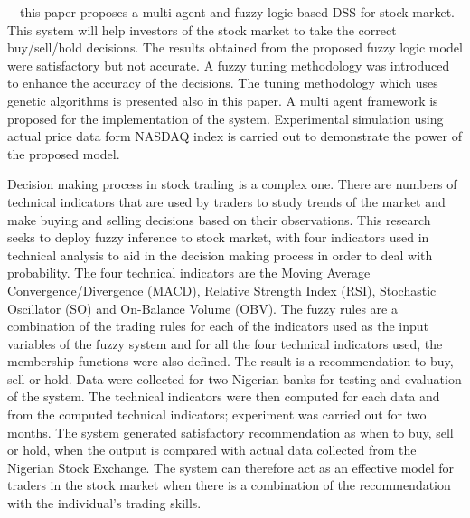 \cite{Gamil2007} —this paper proposes a multi agent and fuzzy logic based DSS
for stock market. This system will help investors of the stock market to take
the correct buy/sell/hold decisions. The results obtained from the proposed
fuzzy logic model were satisfactory but not accurate. A fuzzy tuning methodology
was introduced to enhance the accuracy of the decisions. The tuning methodology
which uses genetic algorithms is presented also in this paper. A multi agent
framework is proposed for the implementation of the system. Experimental
simulation using actual price data form NASDAQ index is carried out to
demonstrate the power of the proposed model.

\cite{Ijegwa2014} Decision making process in stock trading is a complex
one. There are numbers of technical indicators that are used by traders to study
trends of the market and make buying and selling decisions based on their
observations. This research seeks to deploy fuzzy inference to stock market,
with four indicators used in technical analysis to aid in the decision making
process in order to deal with probability. The four technical indicators are the
Moving Average Convergence/Divergence (MACD), Relative Strength Index (RSI),
Stochastic Oscillator (SO) and On-Balance Volume (OBV). The fuzzy rules are a
combination of the trading rules for each of the indicators used as the input
variables of the fuzzy system and for all the four technical indicators used,
the membership functions were also defined. The result is a recommendation to
buy, sell or hold. Data were collected for two Nigerian banks for testing and
evaluation of the system. The technical indicators were then computed for each
data and from the computed technical indicators; experiment was carried out for
two months. The system generated satisfactory recommendation as when to buy,
sell or hold, when the output is compared with actual data collected from the
Nigerian Stock Exchange. The system can therefore act as an effective model for
traders in the stock market when there is a combination of the recommendation
with the individual’s trading skills.

